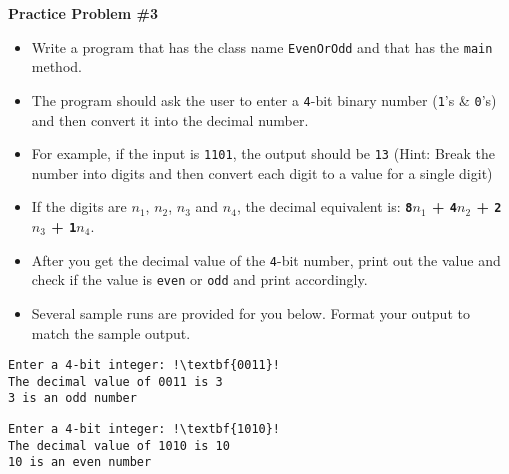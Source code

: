 \documentclass[12pt]{article}
\begin{document}
\vspace*{0.5cm}
\noindent\textbf{Practice Problem \#3}
\begin{itemize}
	\item Write a program that has the class name \texttt{EvenOrOdd} and that has the \texttt{main} method.
	\item The program should ask the user to enter a \texttt{4}-bit binary number (\texttt{1}'s \& \texttt{0}'s) and then convert it into the decimal number.
	\item For example, if the input is \texttt{1101}, the output should be \texttt{13} (Hint: Break the number into digits and then convert each digit to a value for a single digit)
	\item If the digits are \texttt{$n_1$}, \texttt{$n_2$}, \texttt{$n_3$} and \texttt{$n_4$}, the decimal equivalent is:  \textbf{\texttt{8$n_1$} + \texttt{4$n_2$} + \texttt{2$n_3$} + \texttt{1$n_4$}}.
	\item After you get the decimal value of the \texttt{4}-bit number, print out the value and check if the value is \texttt{even} or \texttt{odd} and print accordingly.
	\item Several sample runs are provided for you below. Format your output to match the sample output.
\end{itemize}
\begin{center}
\begin{minipage}{5.25cm}
\begin{lstlisting}[escapechar=!]
Enter a 4-bit integer: !\textbf{0011}!
The decimal value of 0011 is 3
3 is an odd number
\end{lstlisting}
\end{minipage}
\hspace*{0.5cm}
\begin{minipage}{5.25cm}
\begin{lstlisting}[escapechar=!]
Enter a 4-bit integer: !\textbf{1010}!
The decimal value of 1010 is 10
10 is an even number
\end{lstlisting}
\end{minipage}
\hspace*{0.5cm}
\end{center}	
\end{document}
